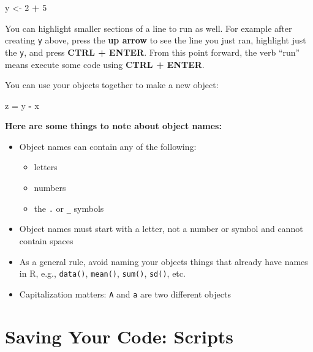 \documentclass[]{book}
\newenvironment{Shaded}{\begin{snugshade}}{\end{snugshade}}
\newcommand{\DecValTok}[1]{\textcolor[rgb]{0.00,0.00,0.81}{#1}}
\newcommand{\StringTok}[1]{\textcolor[rgb]{0.31,0.60,0.02}{#1}}
\newcommand{\OperatorTok}[1]{\textcolor[rgb]{0.81,0.36,0.00}{\textbf{#1}}}
\newcommand{\NormalTok}[1]{#1}
\providecommand{\tightlist}{%
  \setlength{\itemsep}{0pt}\setlength{\parskip}{0pt}}
\theoremstyle{definition}
\theoremstyle{definition}
\theoremstyle{definition}
\theoremstyle{remark}
\begin{document}
\begin{Shaded}
\begin{Highlighting}[]
\NormalTok{y <-}\StringTok{ }\DecValTok{2} \OperatorTok{+}\StringTok{ }\DecValTok{5}
\end{Highlighting}
\end{Shaded}

You can highlight smaller sections of a line to run as well. For example
after creating \texttt{y} above, press the \textbf{up arrow} to see the
line you just ran, highlight just the \texttt{y}, and press \textbf{CTRL
+ ENTER}. From this point forward, the verb ``run'' means execute some
code using \textbf{CTRL + ENTER}.

You can use your objects together to make a new object:

\begin{Shaded}
\begin{Highlighting}[]
\NormalTok{z =}\StringTok{ }\NormalTok{y }\OperatorTok{-}\StringTok{ }\NormalTok{x}
\end{Highlighting}
\end{Shaded}

\textbf{Here are some things to note about object names:}

\begin{itemize}
\tightlist
\item
  Object names can contain any of the following:

  \begin{itemize}
  \tightlist
  \item
    letters
  \item
    numbers
  \item
    the \texttt{.} or \texttt{\_} symbols
  \end{itemize}
\item
  Object names must start with a letter, not a number or symbol and
  cannot contain spaces
\item
  As a general rule, avoid naming your objects things that already have
  names in R, e.g., \texttt{data()}, \texttt{mean()}, \texttt{sum()},
  \texttt{sd()}, etc.
\item
  Capitalization matters: \texttt{A} and \texttt{a} are two different
  objects
\end{itemize}

\section{Saving Your Code: Scripts}\label{scripts}
\end{document}

